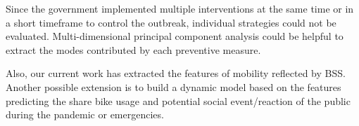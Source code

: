 \documentclass[ijgi,submit,moreauthors,pdftex]{Definitions/mdpi}
\begin{document}
Since the government implemented multiple interventions at the same time or in a short timeframe to control the outbreak, individual strategies could not be evaluated.
Multi-dimensional principal component analysis could be helpful to extract the modes contributed by each preventive measure.

Also, our current work has extracted the features of mobility reflected by BSS.
Another possible extension is to build a dynamic model based on the features predicting the share bike usage and potential social event/reaction of the public during the pandemic or emergencies.



\vspace{6pt} 



\end{document}

